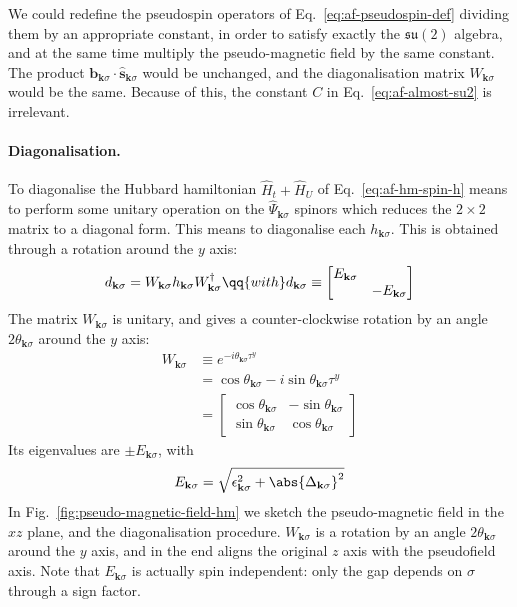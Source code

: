We could redefine the pseudospin operators of Eq.~\eqref{eq:af-pseudospin-def} dividing them by an appropriate constant, in order to satisfy exactly the $\mathfrak{su}(2)$ algebra, and at the same time multiply the pseudo-magnetic field by the same constant. The product $\mathbf{b}_{\mathbf{k}\sigma} \cdot \hat{\mathbf{s}}_{\mathbf{k}\sigma}$ would be unchanged, and the diagonalisation matrix $W_{\mathbf{k}\sigma}$ would be the same. Because of this, the constant $C$ in Eq.~\eqref{eq:af-almost-su2} is irrelevant.

\paragraph{Diagonalisation.}

To diagonalise the Hubbard hamiltonian $\hat H_t + \hat H_U$ of Eq.~\eqref{eq:af-hm-spin-h} means to perform some unitary operation on the $\hat \Psi_{\mathbf{k}\sigma}$ spinors which reduces the $2 \times 2$ matrix to a diagonal form. This means to diagonalise each $h_{\mathbf{k}\sigma}$. This is obtained through a rotation around the $y$ axis:
\begin{equation}\label{eq:af-WhW+-hm}
	d_{\mathbf{k}\sigma} = W_{\mathbf{k}\sigma} h_{\mathbf{k}\sigma} W_{\mathbf{k}\sigma}^\dagger
	\qq{with}
	d_{\mathbf{k}\sigma} \equiv \begin{bmatrix}
		E_{\mathbf{k}\sigma} & \\
		& - E_{\mathbf{k}\sigma}
	\end{bmatrix}
\end{equation}
The matrix $W_{\mathbf{k}\sigma}$ is unitary, and gives a counter-clockwise rotation by an angle $2 \theta_{\mathbf{k}\sigma}$ around the $y$ axis:
\begin{align}
	W_{\mathbf{k}\sigma} &\equiv e^{-i \theta_{\mathbf{k}\sigma} \tau^y} \nonumber\\
	&= \cos \theta_{\mathbf{k}\sigma} -i \sin \theta_{\mathbf{k}\sigma} \tau^y \nonumber\\
	&= \begin{bmatrix}
		\cos \theta_{\mathbf{k}\sigma} & - \sin \theta_{\mathbf{k}\sigma} \\
		\sin \theta_{\mathbf{k}\sigma} & \cos \theta_{\mathbf{k}\sigma}
	\end{bmatrix} \label{eq:af-hm-diagonalizer}
\end{align}
Its eigenvalues are $\pm E_{\mathbf{k}\sigma}$, with
\begin{equation}\label{eq:af-bands}
	E_{\mathbf{k}\sigma} = \sqrt{
		\epsilon_{\mathbf{k}\sigma}^2 + \abs{\Delta_{\mathbf{k}\sigma}}^2
	}
\end{equation}
In Fig.~\ref{fig:pseudo-magnetic-field-hm} we sketch the pseudo-magnetic field in the $xz$ plane, and the diagonalisation procedure. $W_{\mathbf{k}\sigma}$ is a rotation by an angle $2\theta_{\mathbf{k}\sigma}$ around the $y$ axis, and in the end aligns the original $z$ axis with the pseudofield axis. Note that $E_{\mathbf{k}\sigma}$ is actually spin independent: only the gap depends on $\sigma$ through a sign factor.

